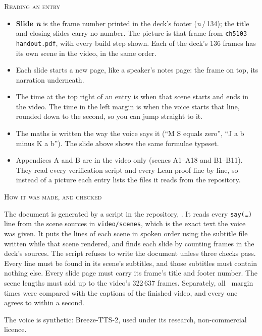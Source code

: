 \documentclass[a4paper,11pt]{article}
\begin{document}
\vspace{4mm}
{\garamond\scshape\color{gold}Reading an entry}\par\vspace{1mm}
\begin{itemize}\setlength{\itemsep}{2pt}
  \item \textbf{Slide \emph{n}} is the frame number printed in the deck’s footer (\emph{n}\,/\,134); the title and
    closing slides carry no number. The picture is that frame from \texttt{ch5103-handout.pdf}, with every build
    step shown. Each of the deck’s 136 frames has its own scene in the video, in the same order.
  \item Each slide starts a new page, like a speaker’s notes page: the frame on top, its narration underneath.
  \item The time at the top right of an entry is when that scene starts and ends in the video. The time in the left
    margin is when the voice starts that line, rounded down to the second, so you can jump straight to it.
  \item The maths is written the way the voice says it (“M S equals zero”, “J a b minus K a b”). The slide above
    shows the same formulae typeset.
  \item Appendices A and B are in the video only (scenes A1–A18 and B1–B11). They read every verification script and every Lean proof line by
    line, so instead of a picture each entry lists the files it reads from the repository.
\end{itemize}

\vspace{3mm}
{\garamond\scshape\color{gold}How it was made, and checked}\par\vspace{1mm}
The document is generated by a script in the repository, . It reads every
\texttt{say(…)} line from the scene sources in \texttt{video/scenes}, which is the exact text the voice was given. It puts the lines of each scene in spoken order
using the subtitle file written while that scene rendered, and finds each slide by counting frames in the deck’s
sources. The script refuses to write the document unless three checks pass. Every line must be found in its scene’s
subtitles, and those subtitles must contain nothing else. Every slide page must carry its frame’s title and footer number. The scene
lengths must add up to the video’s 322\,637 frames. Separately, all \ScriptLines\ margin times were compared with the
captions of the finished video, and every one agrees to within a second.

\vspace{3mm}
{\small\color{muted}The voice is synthetic: Breeze-TTS-2, used under its research, non-commercial licence.}

\clearpage
{}
\tableofcontents

\clearpage
{}

\end{document}
